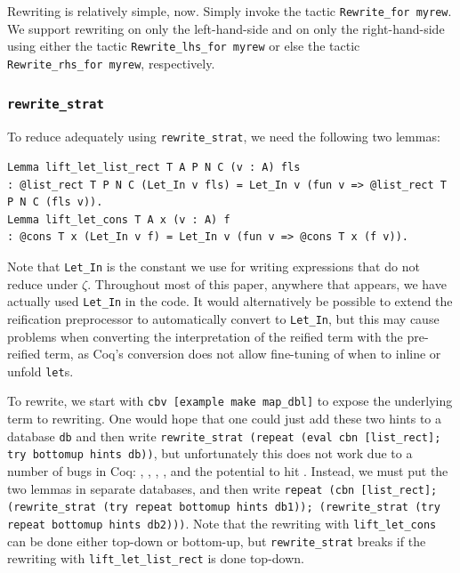 \begin{subappendices}
Rewriting is relatively simple, now.
Simply invoke the tactic \texttt{Rewrite_for myrew}.
We support rewriting on only the left-hand-side and on only the right-hand-side using either the tactic \texttt{Rewrite_lhs_for myrew} or else the tactic \texttt{Rewrite_rhs_for myrew}, respectively.

\subsubsection{\texorpdfstring{\texttt{rewrite\_strat}}{rewrite\_strat}}

To reduce adequately using \texttt{rewrite\_strat}, we need the following two lemmas:
\begin{verbatim}
Lemma lift_let_list_rect T A P N C (v : A) fls
: @list_rect T P N C (Let_In v fls) = Let_In v (fun v => @list_rect T P N C (fls v)).
Lemma lift_let_cons T A x (v : A) f
: @cons T x (Let_In v f) = Let_In v (fun v => @cons T x (f v)).
\end{verbatim}

Note that \texttt{Let_In} is the constant we use for writing  expressions that do not reduce under $\zeta$.
Throughout most of this paper, anywhere that  appears, we have actually used \texttt{Let_In} in the code.
It would alternatively be possible to extend the reification preprocessor to automatically convert  to \texttt{Let_In}, but this may cause problems when converting the interpretation of the reified term with the pre-reified term, as Coq's conversion does not allow fine-tuning of when to inline or unfold \texttt{let}s.

To rewrite, we start with \texttt{cbv [example make map_dbl]} to expose the underlying term to rewriting.
One would hope that one could just add these two hints to a database \texttt{db} and then write \texttt{rewrite\_strat (repeat (eval cbn [list\_rect]; try bottomup hints db))}, but unfortunately this does not work due to a number of bugs in Coq: , , , , and the potential to hit .
Instead, we must put the two lemmas in separate databases, and then write \texttt{repeat (cbn [list\_rect]; (rewrite\_strat (try repeat bottomup hints db1)); (rewrite\_strat (try repeat bottomup hints db2)))}.
Note that the rewriting with \texttt{lift_let_cons} can be done either top-down or bottom-up, but \texttt{rewrite\_strat} breaks if the rewriting with \texttt{lift_let_list_rect} is done top-down.


\end{subappendices}
